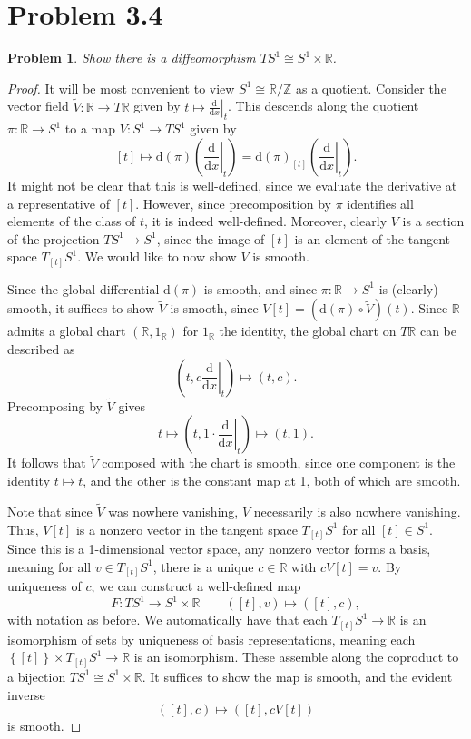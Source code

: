 \documentclass[11pt, letterpaper]{article}
\theoremstyle{plain}
\newtheorem{problem}{Problem}
\begin{document}
\section{Problem 3.4}

\begin{problem}\label{4}
	Show there is a diffeomorphism $TS^1\cong S^1\times \mathbb{R} $.
\end{problem}
\begin{proof}
	It will be most convenient to view $S^1 \cong \mathbb{R} /\mathbb{Z} $ as a quotient. Consider the vector field $\widetilde{V}  : \mathbb{R}  \to T\mathbb{R} $ given by $t\mapsto \left.\frac{\mathrm{d}}{\mathrm{d}x} \right|_t$. This descends along the quotient $\pi : \mathbb{R}  \to S^1$ to a map $V : S^1 \to TS^1$ given by
		\[
			[t]\mapsto \mathrm{d} (\pi )\left( \left. \frac{\mathrm{d}}{\mathrm{d}x} \right|_{t}  \right) =\mathrm{d} (\pi )_{[t]} \left( \left. \frac{\mathrm{d}}{\mathrm{d}x} \right|_t \right) 
		.\]
		It might not be clear that this is well-defined, since we evaluate the derivative at a representative of $[t]$. However, since precomposition by $\pi $ identifies all elements of the class of $t$, it is indeed well-defined. Moreover, clearly $V$ is a section of the projection $TS^1\to S^1$, since the image of $[t]$ is an element of the tangent space $T_{[t]} S^1$. We would like to now show $V$ is smooth.

	Since the global differential $\mathrm{d} (\pi )$ is smooth, and since $\pi : \mathbb{R}  \to S^1$ is (clearly) smooth, it suffices to show $\widetilde{V} $ is smooth, since $V[t]=(\mathrm{d} (\pi )\circ \widetilde{V})(t) $. Since $\mathbb{R} $ admits a global chart $(\mathbb{R} ,1_\mathbb{R} )$ for $1_\mathbb{R} $ the identity, the global chart on $T\mathbb{R} $ can be described as
	\[
		\left( t,\left. c \frac{\mathrm{d}}{\mathrm{d}x} \right|_t \right) \mapsto (t,c)
	.\]
	Precomposing by $\widetilde{V} $ gives
	\[
		t\mapsto \left( t,1\cdot \left. \frac{\mathrm{d}}{\mathrm{d}x} \right|_t \right) \mapsto (t,1)
	.\]
	It follows that $\widetilde{V} $ composed with the chart is smooth, since one component is the identity $t\mapsto t$, and the other is the constant map at 1, both of which are smooth.

	Note that since $\widetilde{V} $ was nowhere vanishing, $V$ necessarily is also nowhere vanishing. Thus, $V[t]$ is a nonzero vector in the tangent space $T_{[t]} S^1$ for all $[t]\in S^1$. Since this is a 1-dimensional vector space, any nonzero vector forms a basis, meaning for all $v\in T_{[t]} S^1$, there is a unique $c\in\mathbb{R} $ with $cV[t]=v$. By uniqueness of $c$, we can construct a well-defined map
	\[
		F : TS^1 \to S^1\times \mathbb{R} \qquad ([t],v)\mapsto ([t],c)
	,\]
	with notation as before. We automatically have that each $T_{[t]} S^1 \to \mathbb{R} $ is an isomorphism of sets by uniqueness of basis representations, meaning each $\left\{ [t] \right\} \times T_{[t]} S^1 \to \mathbb{R} $ is an isomorphism. These assemble along the coproduct to a bijection $TS^1 \cong S^1\times \mathbb{R} $. It suffices to show the map is smooth, and the evident inverse
	\[
		([t],c)\mapsto ([t],cV[t])
	\]
	is smooth.


\end{proof}
\end{document}
